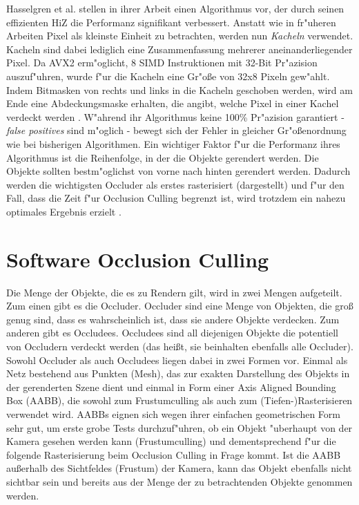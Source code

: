 \documentclass[journal]{vgtc}
\begin{document}
Hasselgren et al. \cite{MSOC} stellen in ihrer Arbeit einen Algorithmus vor, der durch seinen effizienten HiZ die Performanz signifikant verbessert. Anstatt wie in fr"uheren Arbeiten Pixel als kleinste Einheit zu betrachten, werden nun \textit{Kacheln} verwendet. Kacheln sind dabei lediglich eine Zusammenfassung mehrerer aneinanderliegender Pixel. Da AVX2 erm"oglicht, 8 SIMD Instruktionen mit 32-Bit Pr"azision auszuf"uhren, wurde f"ur die Kacheln eine Gr"o\ss{}e von 32x8 Pixeln gew"ahlt. Indem Bitmasken von rechts und links in die Kacheln geschoben werden, wird am Ende eine Abdeckungsmaske erhalten, die angibt, welche Pixel in einer Kachel verdeckt werden \cite{MSOC}.
W"ahrend ihr Algorithmus keine 100\% Pr"azision garantiert - \textit{false positives} sind m"oglich - bewegt sich der Fehler in gleicher Gr"o\ss{}enordnung wie bei bisherigen Algorithmen. Ein wichtiger Faktor f"ur die Performanz ihres Algorithmus ist die Reihenfolge, in der die Objekte gerendert werden. Die Objekte sollten bestm"oglichst von vorne nach hinten gerendert werden. Dadurch werden die wichtigsten Occluder als erstes rasterisiert (dargestellt) und f"ur den Fall, dass die Zeit f"ur Occlusion Culling begrenzt ist, wird trotzdem ein nahezu optimales Ergebnis erzielt \cite{MSOC}.



\section{Software Occlusion Culling}
Die Menge der Objekte, die es zu Rendern gilt, wird in zwei Mengen aufgeteilt. Zum einen gibt es die Occluder. Occluder sind eine Menge von Objekten, die gro{\ss} genug sind, dass es wahrscheinlich ist, dass sie andere Objekte verdecken. Zum anderen gibt es Occludees. Occludees sind all diejenigen Objekte die potentiell von Occludern verdeckt werden (das hei{\ss}t, sie beinhalten ebenfalls alle Occluder). Sowohl Occluder als auch Occludees liegen dabei in zwei Formen vor. Einmal als Netz bestehend aus Punkten (Mesh), das zur exakten Darstellung des Objekts in der gerenderten Szene dient und einmal in Form einer Axis Aligned Bounding Box (AABB), die sowohl zum Frustumculling als auch zum (Tiefen-)Rasterisieren verwendet wird. AABBs eignen sich wegen ihrer einfachen geometrischen Form sehr gut, um erste grobe Tests durchzuf"uhren, ob ein Objekt "uberhaupt von der Kamera gesehen werden kann (Frustumculling) und dementsprechend f"ur die folgende Rasterisierung beim Occlusion Culling in Frage kommt. Ist die AABB au{\ss}erhalb des Sichtfeldes (Frustum) der Kamera, kann das Objekt ebenfalls nicht sichtbar sein und bereits aus der Menge der zu betrachtenden Objekte genommen werden.
\end{document}
